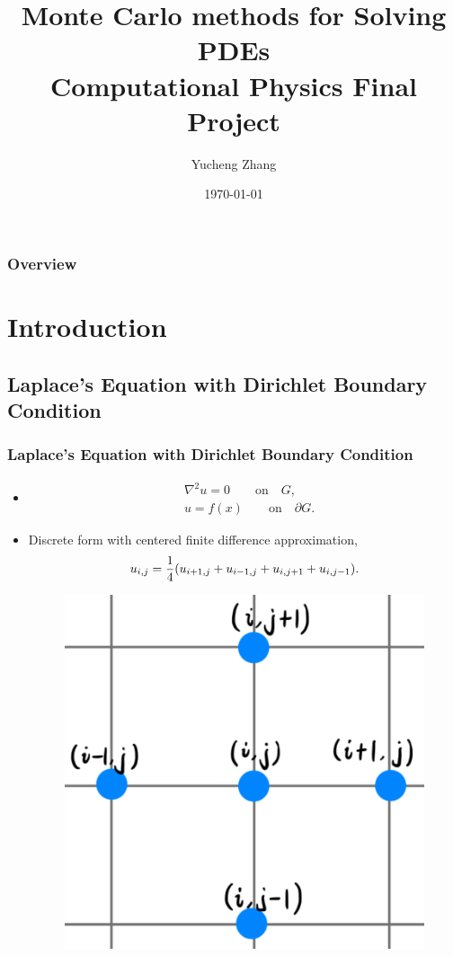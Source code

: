 \documentclass{beamer}
\title[MC methods for PDEs]{Monte Carlo methods for Solving PDEs\\Computational Physics Final Project}
\author{Yucheng Zhang}
\institute[Physics @ NYU]
{
Department of Physics, New York University \\
\medskip
\textit{yz4035@nyu.edu}
}
\date{\today}
\begin{document}
\begin{frame}
\titlepage
\end{frame}

\begin{frame}
\frametitle{Overview}
\tableofcontents
\end{frame}


\section{Introduction}


\subsection{Laplace's Equation with Dirichlet Boundary Condition}

\begin{frame}
\frametitle{Laplace's Equation with Dirichlet Boundary Condition}
\begin{itemize}
\item
\begin{equation*}
    \begin{split}
        &\nabla^2 u = 0 \qquad \text{on}\quad G, \\
        &u = f(x) \qquad \text{on}\quad \partial G.
    \end{split}
\end{equation*}
\item
Discrete form with centered finite difference approximation,
\begin{equation*}
    u_{i,j} = \frac{1}{4} \qty(u_{i+1,j}+u_{i-1,j}+u_{i,j+1}+u_{i,j-1}).
\end{equation*}
\begin{figure}[htbp]
    \centering
    \includegraphics[width=.3\textwidth]{./figs/disc}
\end{figure}
\end{itemize}
\end{frame}
\end{document}
